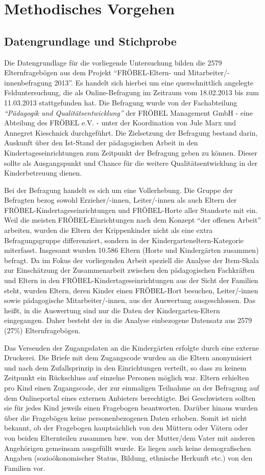 \documentclass[12pt,a4paper]{article}
\begin{document}
\section{Methodisches Vorgehen}  
\subsection{Datengrundlage und Stichprobe}
Die Datengrundlage für die vorliegende Untersuchung bilden die 2579 Elternfragebögen aus dem Projekt "`FRÖBEL-Eltern- und Mitarbeiter/-innenbefragung 2013"'. Es handelt sich hierbei um eine querschnittlich angelegte Felduntersuchung, die als Online-Befragung im Zeitraum vom 18.02.2013 bis zum 11.03.2013 stattgefunden hat. Die Befragung wurde von der Fachabteilung \textit{"`Pädagogik und Qualitätsentwicklung"'} der FRÖBEL Management GmbH - eine Abteilung des FRÖBEL e.V. - unter der Koordination von Jule Marx und Annegret Kieschnick durchgeführt. Die Zielsetzung der Befragung bestand darin, Auskunft über den Ist-Stand der pädagogischen Arbeit in den Kindertageseinrichtungen zum Zeitpunkt der Befragung geben zu können. Dieser sollte als  Ausgangspunkt und Chance für die weitere Qualitätsentwicklung in der Kinderbetreuung dienen.

	Bei der Befragung handelt es sich um eine Vollerhebung. Die Gruppe der Befragten bezog sowohl Erzieher/-innen, Leiter/-innen als auch Eltern der FRÖBEL-Kindertageseinrichtungen und FRÖBEL-Horte aller Standorte mit ein. Weil die meisten FRÖBEL-Einrichtungen nach dem Konzept "`der offenen Arbeit"' arbeiten, wurden die Eltern der Krippenkinder nicht als eine extra Befragungsgruppe differenziert, sondern in der Kindergarteneltern-Kategorie miterfasst. Insgesamt wurden 10.586 Eltern (Horte und Kindergärten zusammen) befragt. Da im Fokus der vorliegenden Arbeit speziell die Analyse der Item-Skala zur Einschätzung der Zusammenarbeit zwischen den pädagogischen Fachkräften und Eltern in den FRÖBEL-Kindertageseinrichtungen aus der Sicht der Familien steht, wurden Eltern, deren Kinder einen FRÖBEL-Hort besuchen, Leiter/-innen sowie pä\-da\-go\-gi\-sche Mitarbeiter/-innen, aus der Auswertung ausgeschlossen. Das heißt, in die Auswertung sind nur die Daten der Kindergarten-Eltern eingegangen. Daher besteht der in die Analyse einbezogene Datensatz aus 2579 (27\%) Elternfragebögen.
	
	Das Versenden der Zugangsdaten an die Kindergärten erfolgte durch eine externe Druckerei. Die Briefe mit dem Zugangscode wurden an die Eltern anonymisiert und nach dem Zufallsprinzip in den Einrichtungen verteilt, so dass zu keinem Zeitpunkt ein Rückschluss auf einzelne Personen möglich war. Eltern erhielten pro Kind einen Zugangscode, der zur einmaligen Teilnahme an der Befragung auf dem Onlineportal eines externen Anbieters berechtigte. Bei Geschwistern sollten sie für jedes Kind jeweils einen Fragebogen beantworten. Darüber hinaus wurden über die Fragebögen keine personenbezogenen Daten erhoben. Somit ist nicht bekannt, ob der Fragebogen hauptsächlich von den Müttern oder Vätern oder von beiden Elternteilen zusammen bzw. von der Mutter/dem Vater mit anderen Angehörigen gemeinsam ausgefüllt wurde. Es liegen auch keine demografischen Angaben (sozioökonomischer Status, Bildung, ethnische Herkunft etc.) von den Familien vor.
\end{document}
